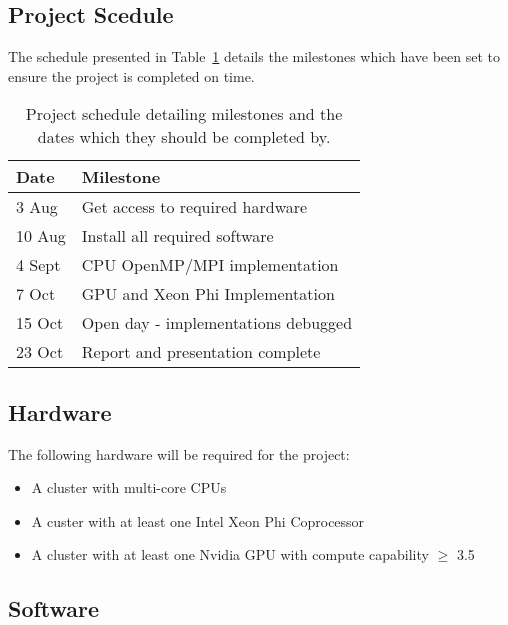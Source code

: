 \documentclass[10pt,a4paer,twocolumn]{article}
\begin{document}
\subsection{Project Scedule}
The schedule presented in Table~\ref{tab:sched} details the milestones which have been set to ensure the 
project is completed on time.
\begin{table}[b!]
    \small
    \centering
    \caption{Project schedule detailing milestones and the dates which they should be completed by.}
    \label{tab:sched}
    \vspace{0.2cm}
    \begin{tabular}{l l}
        \hline  
        Date    & Milestone                                                         \\
        \hline
        \hline
        3 Aug   & Get access to required hardware                                   \\
        10 Aug  & Install all required software                                     \\
        4 Sept  & CPU OpenMP/MPI implementation                                     \\
        7 Oct   & GPU and Xeon Phi Implementation                                   \\
        15 Oct  & Open day - implementations debugged                               \\
        23 Oct  & Report and presentation complete                                  \\\hline
    \end{tabular}
\end{table}
\subsection{Hardware} \label{ssec:hware}

The following hardware will be required for the project:
\begin{itemize}[noitemsep]
    \item{A cluster with multi-core CPUs}
    \item{A custer with at least one Intel Xeon Phi Coprocessor}
    \item{A cluster with at least one Nvidia GPU with compute capability $\ge$ 3.5}
\end{itemize}

\subsection{Software} \label{ssec:sware}
\end{document}

